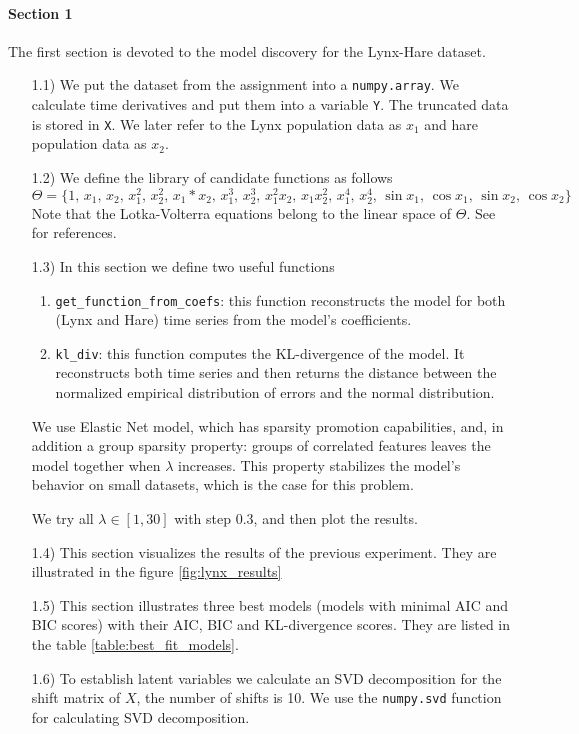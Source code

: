 \documentclass{article}
\begin{document}
\paragraph{Section 1} The first section is devoted to the model discovery for the Lynx-Hare dataset. 
\begin{enumerate}
    \item[1.1)] We put the dataset from the assignment into a \texttt{numpy.array}. We calculate time derivatives and put them into a variable \texttt{Y}. The truncated data is stored in \texttt{X}. We later refer to the Lynx population data as $x_1$ and hare population data as $x_2$. 
    \item[1.2)] We define the library of candidate functions as follows
        \[
            \Theta = \{1, \, x_1,\, x_2,\, x_1^2,\, x_2^2,\,  x_1*x_2,\, x_1^3,\, x_2^3,\, x_1^2x_2,\, x_1x_2^2,\, x_1^4,\, x_2^4,\, \sin{x_1},\, \cos{x_1},\, \sin{x_2},\, \cos{x_2}\}        
        \]
        Note that the Lotka-Volterra equations belong to the linear space of $\Theta$. See \cite{lotka} for references.  
    \item[1.3)] In this section we define two useful functions
        \begin{enumerate}
            \item \texttt{get\_function\_from\_coefs}: this function reconstructs the model for both (Lynx and Hare) time series from the model's coefficients. 
            \item \texttt{kl\_div}: this function computes the KL-divergence of the model. It reconstructs both time series and then returns the distance between the normalized empirical distribution of errors and the normal distribution.
        \end{enumerate}
    
    We use Elastic Net model, which has sparsity promotion capabilities, and, in addition a group sparsity property: groups of correlated features leaves the model together when $\lambda$ increases. This property stabilizes the model's behavior on small datasets, which is the case for this problem.
    
    We try all $\lambda \in [1, 30]$ with step $0.3$, and then plot the results. 
    
    \item[1.4)] This section visualizes the results of the previous experiment. They are illustrated in the figure \ref{fig:lynx_results}
    \item[1.5)] This section illustrates three best models (models with minimal AIC and BIC scores) with their AIC, BIC and KL-divergence scores. They are listed in the table \ref{table:best_fit_models}.
    \item[1.6)] To establish latent variables we calculate an SVD decomposition for the shift matrix of $X$, the number of shifts is 10. We use the \texttt{numpy.svd} function for calculating SVD decomposition.
\end{enumerate}
\end{document}

